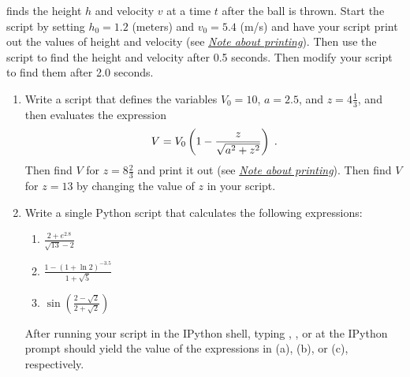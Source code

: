 \documentclass[letterpaper,10pt,english]{sphinxmanual}
\begin{document}
finds the height \(h\) and velocity \(v\) at a time \(t\) after the ball is thrown. Start the script by setting \(h_0 = 1.2\) (meters) and \(v_0 = 5.4\) (m/s) and have your script print out the values of height and velocity (see {\hyperref[chap2/chap2_basics:printnote]{\emph{Note about printing}}}). Then use the script to find the height and velocity after 0.5 seconds. Then modify your script to find them after 2.0 seconds.
\begin{enumerate}
\item {} 
Write a script that defines the variables \(V_0 = 10\), \(a = 2.5\), and \(z = 4\tfrac{1}{3}\), and then evaluates the expression
\begin{gather}
\begin{split}V = V_0 \left( 1 - \frac{z}{\sqrt{a^2+z^2}} \right) \;.\end{split}\notag
\end{gather}
Then find \(V\) for \(z=8\frac{2}{3}\) and print it out (see {\hyperref[chap2/chap2_basics:printnote]{\emph{Note about printing}}}). Then find \(V\) for \(z=13\) by changing the value of \(z\) in your script.

\item {} 
Write a single Python script that calculates the following expressions:
\begin{enumerate}
\item {} 
\(\displaystyle\frac{2 + e^{2.8}}{\sqrt{13}-2}\)

\item {} 
\(\displaystyle\frac{1-(1+\ln 2)^{-3.5}}{1+\sqrt{5}}\)

\item {} 
\(\displaystyle\sin\left( \frac{2-\sqrt{2}}{2+\sqrt{2}} \right)\)

\end{enumerate}

After running your script in the IPython shell, typing , , or  at the IPython prompt should yield the value of the expressions in (a), (b), or (c), respectively.


\end{enumerate}
\end{document}
